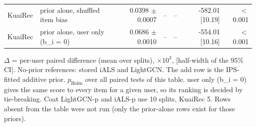 \begin{table}[htbp]
{\begin{tabular}{llrrrrr}
KuaiRec & prior alone, shuffled item bias & 0.0398 $\pm$ 0.0007 & -- & -- & -582.01 [10.19] & $<$0.001 \\
KuaiRec & prior alone, user only (b\_i = 0) & 0.0686 $\pm$ 0.0010 & -- & -- & -554.01 [10.16] & $<$0.001 \\
\bottomrule
\end{tabular}}
\par\smallskip\raggedright\footnotesize $\Delta$ = per-user paired difference (mean over splits), $\times10^{3}$, [half-width of the 95\% CI]. No-prior references: stored iALS and LightGCN. The add row is the IPS-fitted additive prior. $p_\mathrm{Holm}$ over all paired tests of this table. user only (b\_i = 0) gives the same score to every item for a given user, so its ranking is decided by tie-breaking. Coat LightGCN-p and iALS-p use 10 splits, KuaiRec 5. Rows absent from the table were not run (only the prior-alone rows exist for those priors).
\end{table}
